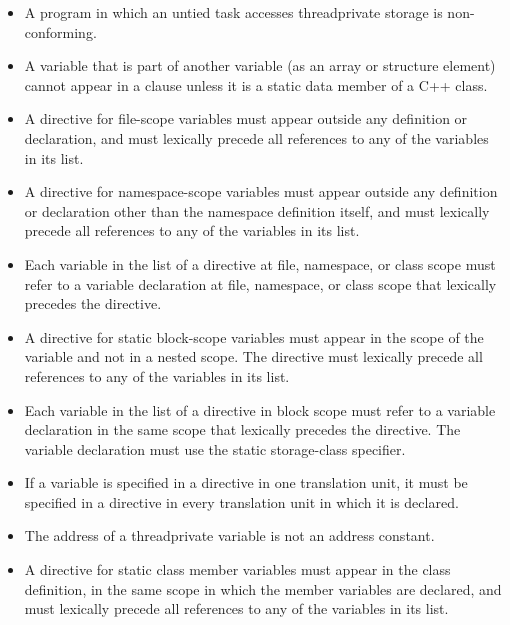 {{{{\begin{itemize}
\item A program in which an untied task accesses threadprivate storage is non-conforming.

\ccppspecificstart
\item A variable that is part of another variable (as an array or structure element) cannot 
appear in a  clause unless it is a static data member of a C++ 
class.

\item A  directive for file-scope variables must appear outside any 
definition or declaration, and must lexically precede all references to any of the 
variables in its list.

\item A  directive for namespace-scope variables must appear outside 
any definition or declaration other than the namespace definition itself, and must 
lexically precede all references to any of the variables in its list.

\item Each variable in the list of a  directive at file, namespace, or class 
scope must refer to a variable declaration at file, namespace, or class scope that 
lexically precedes the directive.

\item A  directive for static block-scope variables must appear in the 
scope of the variable and not in a nested scope. The directive must lexically precede 
all references to any of the variables in its list.

\item Each variable in the list of a  directive in block scope must refer to 
a variable declaration in the same scope that lexically precedes the directive. The 
variable declaration must use the static storage-class specifier.

\item If a variable is specified in a  directive in one translation unit, it 
must be specified in a  directive in every translation unit in which 
it is declared.

\item The address of a threadprivate variable is not an address constant.
\ccppspecificend

\cppspecificstart
\item A  directive for static class member variables must appear in the 
class definition, in the same scope in which the member variables are declared, and 
must lexically precede all references to any of the variables in its list.


\end{itemize}}}}}
